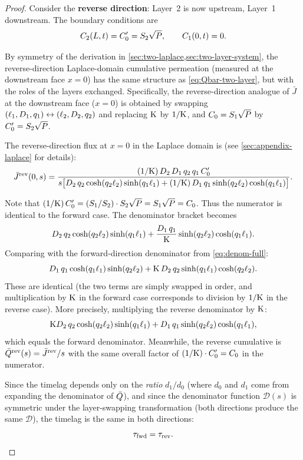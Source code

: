 \begin{proof}
Consider the \textbf{reverse direction}: Layer~2 is now upstream, Layer~1
downstream.  The boundary conditions are
\begin{equation}
  C_2(L,t) = C_0' = S_{2}\sqrt{P}, \qquad C_1(0,t) = 0.
\end{equation}

By symmetry of the derivation in \cref{sec:two-laplace,sec:two-layer-system},
the reverse-direction Laplace-domain cumulative permeation (measured at the
downstream face $x = 0$) has the same structure as
\cref{eq:Qbar-two-layer}, but with the roles of the layers exchanged.
Specifically, the reverse-direction analogue of $\bar{J}$ at the downstream
face ($x = 0$) is obtained by swapping
$(\ell_{1},D_{1},q_1) \leftrightarrow (\ell_{2},D_{2},q_2)$ and replacing
$\mathrm{K}$ by $1/\mathrm{K}$, and $C_0 = S_{1}\sqrt{P}$ by
$C_0' = S_{2}\sqrt{P}$.

The reverse-direction flux at $x = 0$ in the Laplace domain is (see
\cref{sec:appendix-laplace} for details):
\begin{equation}
  \bar{J}^{\mathrm{rev}}(0,s)
  = \frac{(1/\mathrm{K})\,D_{2}\,D_{1}\,q_2\,q_1\,C_0'}
  {s\bigl[D_{2}\,q_2\cosh(q_2\ell_{2})\sinh(q_1\ell_{1})
    + (1/\mathrm{K})\,D_{1}\,q_1\sinh(q_2\ell_{2})\cosh(q_1\ell_{1})\bigr]}.
\end{equation}

Note that $(1/\mathrm{K})\,C_0' = (S_{1}/S_{2})\cdot S_{2}\sqrt{P}
= S_{1}\sqrt{P} = C_0$.  Thus the numerator is identical to the forward case.
The denominator bracket becomes
\begin{equation}
  D_{2}\,q_2\cosh(q_2\ell_{2})\sinh(q_1\ell_{1})
  + \frac{D_{1}\,q_1}{\mathrm{K}}\sinh(q_2\ell_{2})\cosh(q_1\ell_{1}).
\end{equation}
Comparing with the forward-direction denominator from \cref{eq:denom-full}:
\begin{equation}
  D_{1}\,q_1\cosh(q_1\ell_{1})\sinh(q_2\ell_{2})
  + \mathrm{K}\,D_{2}\,q_2\sinh(q_1\ell_{1})\cosh(q_2\ell_{2}).
\end{equation}
These are identical (the two terms are simply swapped in order, and
multiplication by $\mathrm{K}$ in the forward case corresponds to division by
$1/\mathrm{K}$ in the reverse case).  More precisely, multiplying the reverse
denominator by $\mathrm{K}$:
\begin{equation}
  \mathrm{K}D_{2}\,q_2\cosh(q_2\ell_{2})\sinh(q_1\ell_{1})
  + D_{1}\,q_1\sinh(q_2\ell_{2})\cosh(q_1\ell_{1}),
\end{equation}
which equals the forward denominator.  Meanwhile, the reverse cumulative is
$\bar{Q}^{\mathrm{rev}}(s) = \bar{J}^{\mathrm{rev}}/s$ with the same
overall factor of $(1/\mathrm{K})\cdot C_0' = C_0$ in the numerator.

Since the timelag depends only on the \emph{ratio} $d_1/d_0$ (where $d_0$ and
$d_1$ come from expanding the denominator of $\bar{Q}$), and since the
denominator function $\mathcal{D}(s)$ is symmetric under the layer-swapping
transformation (both directions produce the same $\mathcal{D}$), the timelag
is the same in both directions:
\begin{equation}
  \tau_{\mathrm{fwd}} = \tau_{\mathrm{rev}}.
\end{equation}
\end{proof}

